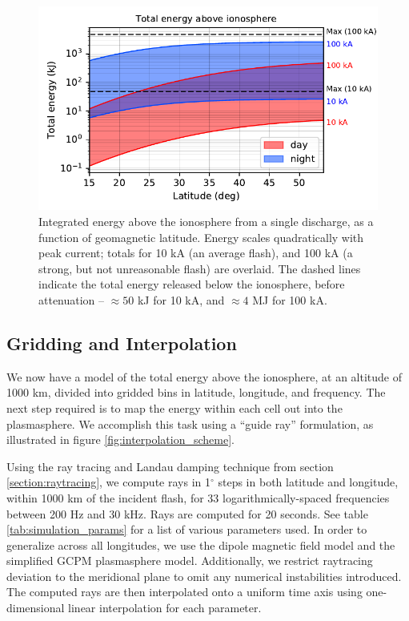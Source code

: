 \begin{figure}[h!]
\begin{center}
\includegraphics{figures/total_energy.pdf}
\caption[Energy above the ionosphere due to a single flash]{Integrated energy above the ionosphere from a single discharge, as a function of geomagnetic latitude. Energy scales quadratically with peak current; totals for 10 kA (an average flash), and 100 kA (a strong, but not unreasonable flash) are overlaid. The dashed lines indicate the total energy released below the ionosphere, before attenuation -- $\approx 50$ kJ for 10 kA, and $\approx 4$ MJ for 100 kA.}
\label{fig:illumination_totals}
\end{center}
\end{figure}


\subsection{Gridding and Interpolation}

We now have a model of the total energy above the ionosphere, at an altitude of 1000 km, divided into gridded bins in latitude, longitude, and frequency. The next step required is to map the energy within each cell out into the plasmasphere. We accomplish this task using a ``guide ray'' formulation, as illustrated in figure \ref{fig:interpolation_scheme}.

Using the ray tracing and Landau damping technique from section \ref{section:raytracing}, we compute rays in 1$^\circ$ steps in both latitude and longitude, within 1000 km of the incident flash, for 33 logarithmically-spaced frequencies between 200 Hz and 30 kHz. Rays are computed for 20 seconds. See table \ref{tab:simulation_params} for a list of various parameters used. In order to generalize across all longitudes, we use the dipole magnetic field model and the simplified GCPM plasmasphere model. Additionally, we restrict raytracing deviation to the meridional plane to omit any numerical instabilities introduced. The computed rays are then interpolated onto a uniform time axis using one-dimensional linear interpolation for each parameter. 

